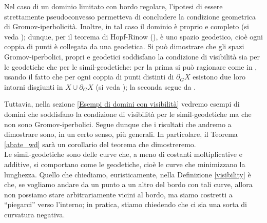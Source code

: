 Nel caso di un dominio limitato con bordo regolare, l'ipotesi di essere strettamente pseudoconvesso permetteva di concludere la condizione geometrica di Gromov-iperbolicità. Inoltre, in tal caso il dominio è proprio e completo (si veda \cite[Paragraph 3.3]{G}); dunque, per il teorema di Hopf-Rinow (\cite[Part I, Paragraph 3, Proposition 3.7]{BH}), è uno spazio geodetico, cioè ogni coppia di punti è collegata da una geodetica. Si può dimostrare che gli spazi Gromov-iperbolici, propri e geodetici soddisfano la condizione di visibilità sia per le geodetiche che per le simil-geodetiche: per la prima si può ragionare come in \cite[Proposition 2.5]{BNT}, usando il fatto che per ogni coppia di punti distinti di $\partial_G X$ esistono due loro intorni disgiunti in $X\cup\partial_GX$ (si veda \cite[Part III, Chapter H, Paragraph 3, Lemma 3.6]{BH}); la seconda segue da \cite[Part III, Chapter H, Paragraph 1, Theorem 1.7]{BH}.

Tuttavia, nella sezione \ref{Esempi di domini con visibilità} vedremo esempi di domini che soddisfano la condizione di visibilità per le simil-geodetiche ma che non sono Gromov-iperbolici. Segue dunque che i risultati che andremo a dimostrare sono, in un certo senso, più generali. In particolare, il Teorema \ref{abate_wd} sarà un corollario del teorema che dimostreremo. \\

Le simil-geodetiche sono delle curve che, a meno di costanti moltiplicative e additive, si comportano come le geodetiche, cioè le curve che minimizzano la lunghezza.
Quello che chiediamo, euristicamente, nella Definizione \ref{visibility} è che, se vogliamo andare da un punto a un altro del bordo con tali curve, allora non possiamo stare arbitrariamente vicini al bordo, ma siamo costretti a ``piegarci'' verso l'interno; in pratica, stiamo chiedendo che ci sia una sorta di curvatura negativa.

